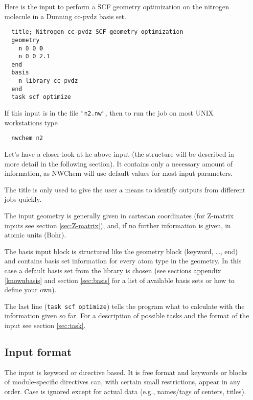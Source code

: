  Here is the input to perform a SCF geometry optimization on the nitrogen
molecule in a Dunning cc-pvdz basis set.
\begin{verbatim}
  title; Nitrogen cc-pvdz SCF geometry optimization
  geometry 
    n 0 0 0
    n 0 0 2.1
  end
  basis
    n library cc-pvdz
  end
  task scf optimize
\end{verbatim}

If this input is in the file \verb+"n2.nw"+, then to run the job on
most UNIX workstations type
\begin{verbatim}
  nwchem n2
\end{verbatim}

Let's have a closer look at he above input (the structure will be
described in more detail in the following section). It contains only a
necessary amount of information, as NWChem will use default values
for most input parameters.

The title is only used to give the user a means to identify
outputs from different jobs quickly.

The input geometry is generally given in cartesian coordinates (for
Z-matrix inputs see section \ref{sec:Z-matrix}), and, if no further
information is given, in atomic units (Bohr). 

The basis input block is structured like the geometry block (keyword,
\ldots, end) and contains basis set information for every atom type in
the geometry. In this case a default basis set from the library is
chosen (see sections appendix \ref{knownbasis} and section
\ref{sec:basis} for a list of available basis sets or how to define
your own).

The last line ({\tt task scf optimize})
tells the program what to calculate with the information given so
far. For a description of possible tasks and the format of the input
see section \ref{sec:task}.

\subsection{Input format}

The input is keyword or directive based.  It is free format and
keywords or blocks of module-specific directives can, with certain
small restrictions, appear in any order.  Case is ignored except
for actual data (e.g., names/tags of centers, titles).

